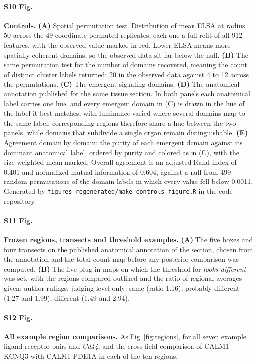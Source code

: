 \documentclass[10pt,letterpaper]{article}
\begin{document}
\paragraph*{S10 Fig.}
\label{S10_Fig}
\textbf{Controls.} \textbf{(A)} Spatial permutation test. Distribution of mean ELSA at radius
50 across the 49 coordinate-permuted replicates, each one a full refit of all 912 features,
with the observed value marked in red. Lower ELSA means more spatially coherent domains, so
the observed data sit far below the null. \textbf{(B)} The same permutation test for the
number of domains recovered, meaning the count of distinct cluster labels returned: 20 in the
observed data against 4 to 12 across the permutations. \textbf{(C)} The emergent signaling
domains. \textbf{(D)} The anatomical annotation published for the same tissue section. In both
panels each anatomical label carries one hue, and every emergent domain in (C) is drawn in the
hue of the label it best matches, with luminance varied where several domains map to the same
label; corresponding regions therefore share a hue between the two panels, while domains that
subdivide a single organ remain distinguishable. \textbf{(E)} Agreement domain by domain: the
purity of each emergent domain against its dominant anatomical label, ordered by purity and
colored as in (C), with the size-weighted mean marked. Overall agreement is an adjusted Rand
index of 0.401 and normalized mutual information of 0.604, against a null from 499 random
permutations of the domain labels in which every value fell below 0.0011. Generated by
\texttt{figures-regenerated/make-controls-figure.R} in the code repository.

\paragraph*{S11 Fig.}
\label{S11_Fig}
\textbf{Frozen regions, transects and threshold examples.} \textbf{(A)} The five boxes and four transects on the published anatomical annotation of the section, chosen from the annotation and the total-count map before any posterior comparison was computed. \textbf{(B)} The five plug-in maps on which the threshold for \textit{looks different} was set, with the regions compared outlined and the ratio of regional averages given; author rulings, judging level only: same (ratio 1.16), probably different (1.27 and 1.99), different (1.49 and 2.94).

\paragraph*{S12 Fig.}
\label{S12_Fig}
\textbf{All example region comparisons.} As Fig~\ref{fig:regions}, for all seven example ligand-receptor pairs and \textit{Cd44}, and the cross-field comparison of CALM1-KCNQ3 with CALM1-PDE1A in each of the ten regions.
\end{document}
